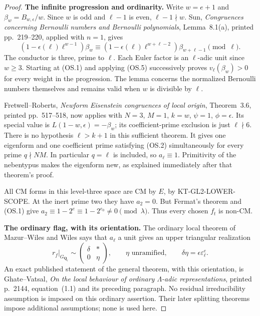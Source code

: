 \documentclass[11pt,a4paper]{article}
\theoremstyle{definition}
\renewcommand{\paragraph}[1]{\par\smallskip\noindent\textbf{#1}\quad\ignorespaces}
\begin{document}
\begin{proof}
\paragraph{The infinite progression and ordinarity.}
Write $w=e+1$ and
$\beta_w=B_{w,\epsilon}/w$. Since $w$ is odd and $\ell-1$
is even, $\ell-1\nmid w$. Sun, \emph{Congruences concerning
Bernoulli numbers and Bernoulli polynomials}, Lemma~8.1(a),
printed pp.~219--220, applied with $n=1$, gives
\[
 (1-\epsilon(\ell)\ell^{w-1})\beta_w
 \equiv
 (1-\epsilon(\ell)\ell^{w+\ell-2})\beta_{w+\ell-1}
                         \pmod\ell.                         \tag{OS.5}
\]
The conductor is three, prime to $\ell$. Each Euler factor
is an $\ell$-adic unit since $w\geq3$. Starting at (OS.1)
and applying (OS.5) successively proves $v_\ell(\beta_w)>0$
for every weight in the progression. The lemma concerns
the normalized Bernoulli numbers themselves and remains
valid when $w$ is divisible by $\ell$.

Fretwell--Roberts, \emph{Newform Eisenstein congruences of
local origin}, Theorem~3.6, printed pp.~517--518, now applies
with $N=3$, $M=1$, $k=w$, $\psi=1$, $\phi=\epsilon$.
Its special value is $L(1-w,\epsilon)=-\beta_w$;
its coefficient-prime exclusion is just $\ell\nmid6$.
There is no hypothesis $\ell>k+1$ in this sufficient theorem.
It gives one eigenform and one coefficient prime satisfying
(OS.2) simultaneously for every prime $q\nmid NM$.
In particular $q=\ell$ is included, so $a_\ell\equiv1$.
Primitivity of the nebentypus makes the eigenform new, as
explained immediately after that theorem's proof.

All CM forms in this level-three space are CM by $E$, by
KT-GL2-LOWER-SCOPE. At the inert prime two they have $a_2=0$.
But Fermat's theorem and (OS.1) give
$a_2\equiv1-2^e\equiv1-2^{e_0}\ne0\pmod\lambda$.
Thus every chosen $f_t$ is non-CM.

\paragraph{The ordinary flag, with its orientation.}
The ordinary local theorem of Mazur--Wiles and Wiles says
that $a_\ell$ a unit gives an upper triangular realization
\[
        r_f|_{G_{\mathbf Q_\ell}}\sim
           \begin{pmatrix}\delta&*\\0&\eta\end{pmatrix},
       \qquad \eta\text{ unramified},\qquad
       \delta\eta=\epsilon\varepsilon_\ell^e.                \tag{OS.6}
\]
An exact published statement of the general theorem, with
this orientation, is Ghate--Vatsal, \emph{On the local
behaviour of ordinary $\Lambda$-adic representations},
printed p.~2144, equation~(1.1) and its preceding paragraph.
No residual irreducibility assumption is imposed on this
ordinary assertion. Their later splitting theorems impose
additional assumptions; none is used here.


\end{proof}
\end{document}
